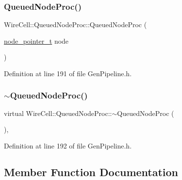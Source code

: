 \subsubsection{\texorpdfstring{Queued\+Node\+Proc()}{QueuedNodeProc()}}
{\footnotesize\ttfamily Wire\+Cell\+::\+Queued\+Node\+Proc\+::\+Queued\+Node\+Proc (\begin{DoxyParamCaption}\item[{\hyperlink{class_wire_cell_1_1_queued_node_proc_a0cfabdd31dec9b3648a1fc0e3cdb090b}{node\+\_\+pointer\+\_\+t}}]{node }\end{DoxyParamCaption})\hspace{0.3cm}{\ttfamily [inline]}}



Definition at line 191 of file Gen\+Pipeline.\+h.

\mbox{\label{class_wire_cell_1_1_queued_node_proc_ae75de0bfaac380a57d44d51545eb56ee}} 
\subsubsection{\texorpdfstring{$\sim$\+Queued\+Node\+Proc()}{~QueuedNodeProc()}}
{\footnotesize\ttfamily virtual Wire\+Cell\+::\+Queued\+Node\+Proc\+::$\sim$\+Queued\+Node\+Proc (\begin{DoxyParamCaption}{ }\end{DoxyParamCaption})\hspace{0.3cm}{\ttfamily [inline]}, {\ttfamily [virtual]}}



Definition at line 192 of file Gen\+Pipeline.\+h.



\subsection{Member Function Documentation}
\mbox{\label{class_wire_cell_1_1_queued_node_proc_a5cbb0b00898b61cbda322e5376ae7608}} 
